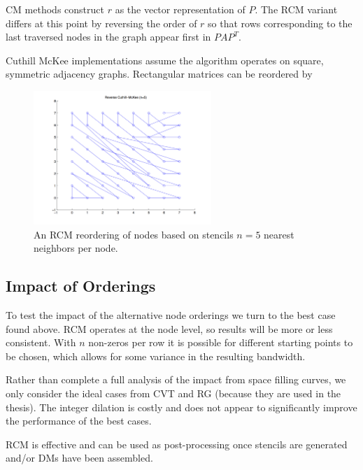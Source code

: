 \documentclass{report}
\begin{document}
CM methods construct $r$ as the vector representation of $P$. The RCM variant differs at this point by reversing the order of $r$ so that rows corresponding to the last traversed nodes in the graph appear first in $PAP^T$. 


Cuthill McKee implementations assume the algorithm operates on square, symmetric adjacency graphs. Rectangular matrices can be reordered by


\begin{figure}
\centering
\includegraphics[width=0.6\textwidth]{rbffd_methods_content/hashing/node_ordering_rcm_n5.png} 
\caption{An RCM reordering of nodes based on stencils $n=5$ nearest neighbors per node.}
\label{fig:orderings}
\end{figure}




\subsection{Impact of Orderings}

To test the impact of the alternative node orderings we turn to the best case found above. RCM operates at the node level, so results will be more or less consistent. With $n$ non-zeros per row it is possible for different starting points to be chosen, which allows for some variance in the resulting bandwidth. 

Rather than complete a full analysis of the impact from space filling curves, we only consider the ideal cases from CVT and RG (because they are used in the thesis). The integer dilation is costly and does not appear to significantly improve the performance of the best cases.

RCM is effective and can be used as post-processing once stencils are generated and/or DMs have been assembled. 
\end{document}
